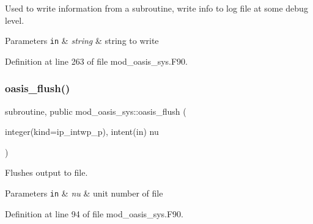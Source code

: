 Used to write information from a subroutine, write info to log file at some debug level. 


\begin{DoxyParams}[1]{Parameters}
\mbox{\tt in}  & {\em string} & string to write \\
\hline
\end{DoxyParams}


Definition at line 263 of file mod\+\_\+oasis\+\_\+sys.\+F90.

\mbox{\label{namespacemod__oasis__sys_ad152b6f737a7e06f8f1226af23d66361}} 
\subsubsection{\texorpdfstring{oasis\+\_\+flush()}{oasis\_flush()}}
{\footnotesize\ttfamily subroutine, public mod\+\_\+oasis\+\_\+sys\+::oasis\+\_\+flush (\begin{DoxyParamCaption}\item[{integer(kind=ip\+\_\+intwp\+\_\+p), intent(in)}]{nu }\end{DoxyParamCaption})}



Flushes output to file. 


\begin{DoxyParams}[1]{Parameters}
\mbox{\tt in}  & {\em nu} & unit number of file \\
\hline
\end{DoxyParams}


Definition at line 94 of file mod\+\_\+oasis\+\_\+sys.\+F90.

\mbox{\label{namespacemod__oasis__sys_a27e13d259fbecbfe09e750d16f50ef25}} 
